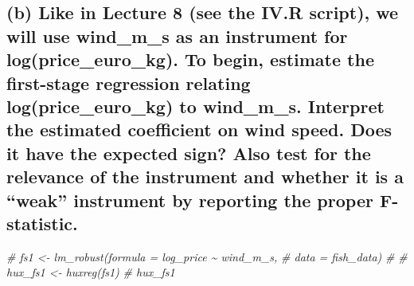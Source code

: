 \documentclass[
]{article}
\newenvironment{Shaded}{\begin{snugshade}}{\end{snugshade}}
\newcommand{\CommentTok}[1]{\textcolor[rgb]{0.56,0.35,0.01}{\textit{#1}}}
\begin{document}
\hypertarget{b-like-in-lecture-8-see-the-iv.r-script-we-will-use-wind_m_s-as-an-instrument-for-logprice_euro_kg.-to-begin-estimate-the-first-stage-regression-relating-logprice_euro_kg-to-wind_m_s.-interpret-the-estimated-coefficient-on-wind-speed.-does-it-have-the-expected-sign-also-test-for-the-relevance-of-the-instrument-and-whether-it-is-a-weak-instrument-by-reporting-the-proper-f-statistic.}{%
\subsection{(b) Like in Lecture 8 (see the IV.R script), we will use
wind\_m\_s as an instrument for log(price\_euro\_kg). To begin, estimate
the first-stage regression relating log(price\_euro\_kg) to wind\_m\_s.
Interpret the estimated coefficient on wind speed. Does it have the
expected sign? Also test for the relevance of the instrument and whether
it is a ``weak'' instrument by reporting the proper
F-statistic.}\label{b-like-in-lecture-8-see-the-iv.r-script-we-will-use-wind_m_s-as-an-instrument-for-logprice_euro_kg.-to-begin-estimate-the-first-stage-regression-relating-logprice_euro_kg-to-wind_m_s.-interpret-the-estimated-coefficient-on-wind-speed.-does-it-have-the-expected-sign-also-test-for-the-relevance-of-the-instrument-and-whether-it-is-a-weak-instrument-by-reporting-the-proper-f-statistic.}}

\begin{Shaded}
\begin{Highlighting}[]
\CommentTok{\# fs1 \textless{}{-} lm\_robust(formula = log\_price \textasciitilde{} wind\_m\_s,}
\CommentTok{\#           data = fish\_data)}
\CommentTok{\# }
\CommentTok{\# hux\_fs1 \textless{}{-} huxreg(fs1)}
\CommentTok{\# hux\_fs1}
\end{Highlighting}
\end{Shaded}
\end{document}
